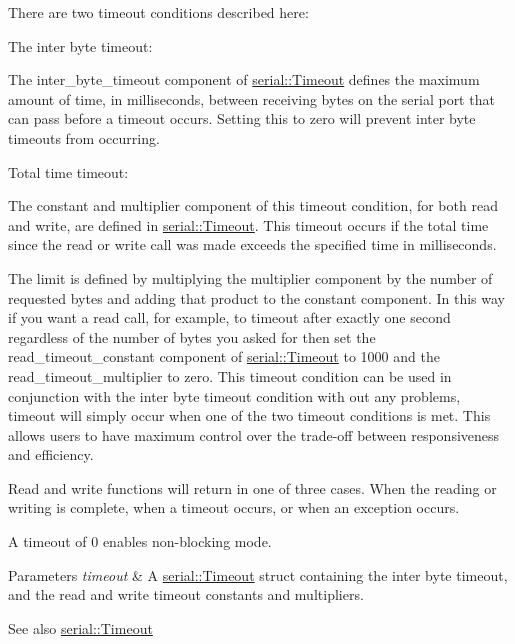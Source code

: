 There are two timeout conditions described here\+:
\begin{DoxyItemize}
\item The inter byte timeout\+:
\begin{DoxyItemize}
\item The inter\+\_\+byte\+\_\+timeout component of \hyperlink{structserial_1_1_timeout}{serial\+::\+Timeout} defines the maximum amount of time, in milliseconds, between receiving bytes on the serial port that can pass before a timeout occurs. Setting this to zero will prevent inter byte timeouts from occurring.
\end{DoxyItemize}
\item Total time timeout\+:
\begin{DoxyItemize}
\item The constant and multiplier component of this timeout condition, for both read and write, are defined in \hyperlink{structserial_1_1_timeout}{serial\+::\+Timeout}. This timeout occurs if the total time since the read or write call was made exceeds the specified time in milliseconds.
\item The limit is defined by multiplying the multiplier component by the number of requested bytes and adding that product to the constant component. In this way if you want a read call, for example, to timeout after exactly one second regardless of the number of bytes you asked for then set the read\+\_\+timeout\+\_\+constant component of \hyperlink{structserial_1_1_timeout}{serial\+::\+Timeout} to 1000 and the read\+\_\+timeout\+\_\+multiplier to zero. This timeout condition can be used in conjunction with the inter byte timeout condition with out any problems, timeout will simply occur when one of the two timeout conditions is met. This allows users to have maximum control over the trade-\/off between responsiveness and efficiency.
\end{DoxyItemize}
\end{DoxyItemize}

Read and write functions will return in one of three cases. When the reading or writing is complete, when a timeout occurs, or when an exception occurs.

A timeout of 0 enables non-\/blocking mode.


\begin{DoxyParams}{Parameters}
{\em timeout} & A \hyperlink{structserial_1_1_timeout}{serial\+::\+Timeout} struct containing the inter byte timeout, and the read and write timeout constants and multipliers.\\
\hline
\end{DoxyParams}
\begin{DoxySeeAlso}{See also}
\hyperlink{structserial_1_1_timeout}{serial\+::\+Timeout} 
\end{DoxySeeAlso}
